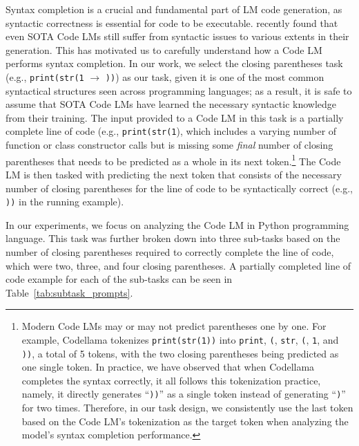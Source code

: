 Syntax completion is a crucial and fundamental part of LM code generation, as syntactic correctness is essential for code to be executable. \citet{dou2024s} recently found that even SOTA Code LMs still suffer from syntactic issues to various extents in their generation. This has motivated us to carefully understand how a Code LM performs syntax completion. In our work, we select the closing parentheses task (e.g., \lstinline|print(str(1| $\rightarrow$ \lstinline|))|) as our task, given it is one of the most common syntactical structures seen across programming languages; as a result, it is safe to assume that SOTA Code LMs have learned the necessary syntactic knowledge from their training. The input provided to a Code LM in this task is a partially complete line of code {(e.g., {\lstinline|print(str(1|})}, which includes a varying number of function or class constructor calls but is missing some \emph{final} number of closing parentheses that needs to be predicted as a whole in its next token.\footnote{Modern Code LMs may or may not predict parentheses one by one. For example, Codellama tokenizes \lstinline|print(str(1))| into \lstinline|print|, \lstinline|(|, \lstinline|str|, \lstinline|(|, \lstinline|1|, and \lstinline|))|, a total of 5 tokens, with the two closing parentheses being predicted as one single token. In practice, we have observed that when Codellama completes the syntax correctly, it all follows this tokenization practice, namely, it directly generates ``\lstinline|))|'' as a single token instead of generating ``\lstinline|)|'' for two times. Therefore, in our task design, we consistently use the last token based on the Code LM's tokenization as the target token when analyzing the model's syntax completion performance.} 
The Code LM is then tasked with predicting the next token that consists of the necessary number of closing parentheses for the line of code to be syntactically correct {(e.g., {\lstinline|))| in the running example})}. 

In our experiments, we focus on analyzing the Code LM in Python programming language.
This task was further broken down into three sub-tasks based on the number of closing parentheses required to correctly complete the line of code, which were two, three, and four closing parentheses. A partially completed line of code example for each of the sub-tasks can be seen in Table~\ref{tab:subtask_prompts}.  



